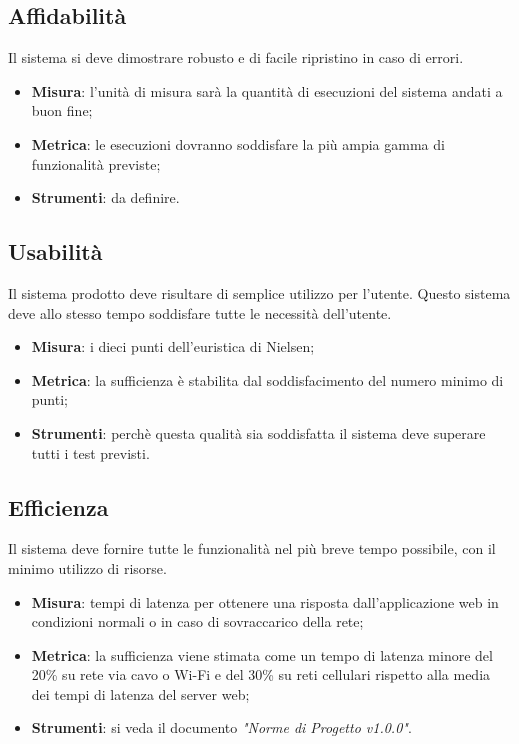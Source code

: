 \documentclass[12pt,a4paper,titlepage]{article}
\begin{document}
		\subsection{Affidabilità}
		Il sistema si deve dimostrare robusto e di facile ripristino in caso di errori.
		\begin{itemize}
			\item \textbf{Misura}: l'unità di misura sarà la quantità di esecuzioni del sistema andati a buon fine;
			\item \textbf{Metrica}: le esecuzioni dovranno soddisfare la più ampia gamma di funzionalità previste;
			\item \textbf{Strumenti}: da definire.
		\end{itemize}
	
		\subsection{Usabilità}
		Il sistema prodotto deve risultare di semplice utilizzo per l'utente. Questo sistema deve allo stesso tempo soddisfare tutte le necessità dell'utente.
		\begin{itemize}
			\item \textbf{Misura}: i dieci punti dell'euristica di Nielsen;
			\item \textbf{Metrica}: la sufficienza è stabilita dal soddisfacimento del numero minimo di punti;
			\item \textbf{Strumenti}: perchè questa qualità sia soddisfatta il sistema deve superare tutti i test previsti.
		\end{itemize}
	
		\subsection{Efficienza}
		Il sistema deve fornire tutte le funzionalità nel più breve tempo possibile, con il minimo utilizzo di risorse.
		\begin{itemize}
			\item \textbf{Misura}: tempi di latenza per ottenere una risposta dall'applicazione web in condizioni normali o in caso di sovraccarico della rete;
			\item \textbf{Metrica}: la sufficienza viene stimata come un tempo di latenza minore del 20\% su rete via cavo o Wi-Fi e del 30\% su reti cellulari rispetto alla media dei tempi di latenza del server web;
			\item \textbf{Strumenti}: si veda il documento \textit{"Norme di Progetto v1.0.0"}.
		\end{itemize}
	
\end{document}
